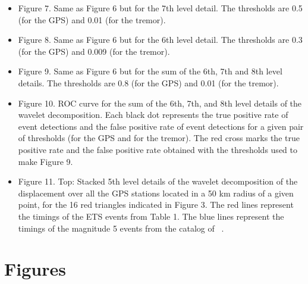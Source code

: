 \documentclass{article}
\begin{document}
\begin{itemize}
\item Figure 7. Same as Figure 6 but for the 7th level detail. The thresholds are 0.5 (for the GPS) and 0.01 (for the tremor).

\item Figure 8. Same as Figure 6 but for the 6th level detail. The thresholds are 0.3 (for the GPS) and 0.009 (for the tremor).

\item Figure 9. Same as Figure 6 but for the sum of the 6th, 7th and 8th level details. The thresholds are 0.8 (for the GPS) and 0.01 (for the tremor).

\item Figure 10. ROC curve for the sum of the 6th, 7th, and 8th level details of the wavelet decomposition. Each black dot represents the true positive rate of event detections and the false positive rate of event detections for a given pair of thresholds (for the GPS and for the tremor). The red cross marks the true positive rate and the false positive rate obtained with the thresholds used to make Figure 9.

\item Figure 11. Top: Stacked 5th level details of the wavelet decomposition of the displacement over all the GPS stations located in a 50 km radius of a given point, for the 16 red triangles indicated in Figure 3. The red lines represent the timings of the ETS events from Table 1. The blue lines represent the timings of the magnitude 5 events from the catalog of ~\citet{MIC_2019}.

\end {itemize}

\newpage

\section*{Figures}
\end{document}
